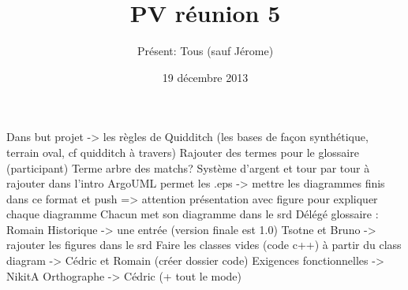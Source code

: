 \documentclass[a4paper,10pt]{article}
\author{Présent: Tous (sauf Jérome)}
\title{PV réunion 5}
\date{19 décembre 2013}
\begin{document}
\maketitle
Dans but projet -> les règles de Quidditch (les bases de façon synthétique, terrain oval, cf quidditch à travers)
Rajouter des termes pour le glossaire (participant)
Terme arbre des matchs?
Système d'argent et tour par tour à rajouter dans l'intro
ArgoUML permet les .eps -> mettre les diagrammes finis dans ce format et push
=> attention présentation avec figure pour expliquer chaque diagramme
Chacun met son diagramme dans le srd
Délégé glossaire : Romain
Historique -> une entrée (version finale est 1.0)
Tsotne et Bruno -> rajouter les figures dans le srd
Faire les classes vides (code c++) à partir du class diagram -> Cédric et Romain
(créer dossier code)
Exigences fonctionnelles -> NikitA
Orthographe -> Cédric (+ tout le mode)
\end{document}

